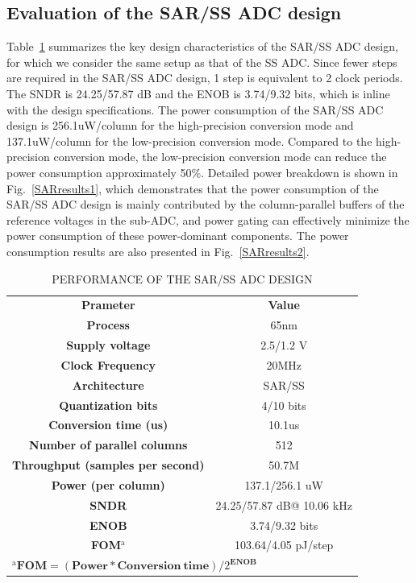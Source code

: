 \subsection{Evaluation of the SAR/SS ADC design}

Table~\ref{tab2} summarizes the key design characteristics of the SAR/SS ADC design, for which 
we consider the same setup as that of the SS ADC. Since fewer steps are required in the SAR/SS ADC 
design, 1 step is equivalent to 2 clock periods. The SNDR is 24.25/57.87 dB and the ENOB is 3.74/9.32 bits, 
which is inline with the design specifications. The power consumption of the SAR/SS ADC design is 256.1uW/column for the high-precision conversion mode and 137.1uW/column for the low-precision conversion mode. 
Compared to the high-precision conversion mode, the low-precision conversion mode can reduce the power 
consumption approximately 50\%. Detailed power breakdown is shown in Fig.~\ref{SARresults1}, which 
demonstrates that the power consumption of the SAR/SS ADC design is mainly contributed by the column-parallel buffers of the reference voltages in the sub-ADC, and power gating can effectively minimize the power consumption of these 
power-dominant components. The power consumption results are also presented in Fig.~\ref{SARresults2}.

\begin{table}[htbp]
	\caption{PERFORMANCE OF THE SAR/SS ADC DESIGN}
	\begin{center}
		\begin{tabular}{|c|c|}
			\hline
			\textbf{Prameter}& \textbf{Value} \\
			\hhline{|==|}
			\textbf{Process}& 65nm \\
			\hline 
			\textbf{Supply voltage}& 2.5/1.2 V \\
			\hline
			\textbf{Clock Frequency}&	20MHz \\
			\hline
			\textbf{Architecture}&	SAR/SS \\
			\hline
			\textbf{Quantization bits}&	4/10 bits \\
			\hline
			\textbf{Conversion time (us)}&	10.1us \\
			\hline
			\textbf{Number of parallel columns}&	512 \\
			\hline
			\textbf{Throughput (samples per second)}&	50.7M \\ 
			\hline
			\textbf{Power (per column)}&	137.1/256.1 uW \\
			\hline
			\textbf{SNDR}& 24.25/57.87 dB@ 10.06 kHz \\
			\hline
			\textbf{ENOB}& 3.74/9.32 bits \\
			\hline
			\textbf{FOM$^{\mathrm{a}}$}& 103.64/4.05 pJ/step\\
			\hline
			\multicolumn{2}{l}{$^{\mathrm{a}}\textbf{FOM}=(\textbf{Power}\ast \textbf{Conversion}\ \textbf{time})/2^{\textbf{ENOB}}$ }	    
		\end{tabular}
		\label{tab2}
	\end{center}
\end{table}


